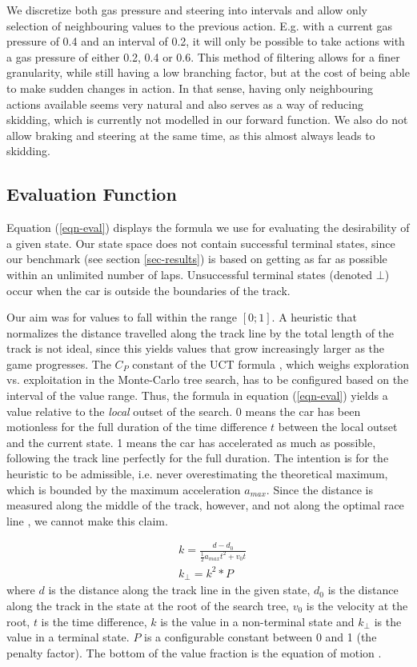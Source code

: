 \documentclass[conference]{IEEEtran}
\begin{document}
We discretize both gas pressure and steering into intervals and allow only selection of neighbouring values to the previous action. E.g. with a current gas pressure of 0.4 and an interval of 0.2, it will only be possible to take actions with a gas pressure of either 0.2, 0.4 or 0.6. This method of filtering allows for a finer granularity, while still having a low branching factor, but at the cost of being able to make sudden changes in action. In that sense, having only neighbouring actions available seems very natural and also serves as a way of reducing skidding, which is currently not modelled in our forward function. We also do not allow braking and steering at the same time, as this almost always leads to skidding.

\subsection{Evaluation Function}
Equation (\ref{eqn-eval}) displays the formula we use for evaluating the desirability of a given state. Our state space does not contain successful terminal states, since our benchmark (see section \ref{sec-results}) is based on getting as far as possible within an unlimited number of laps. Unsuccessful terminal states (denoted $\bot$) occur when the car is outside the boundaries of the track.

Our aim was for values to fall within the range $[0;1]$. A heuristic that normalizes the distance travelled along the track line by the total length of the track is not ideal, since this yields values that grow increasingly larger as the game progresses. The $C_P$ constant of the UCT formula \cite{browne}, which weighs exploration vs. exploitation in the Monte-Carlo tree search, has to be configured based on the interval of the value range. Thus, the formula in equation (\ref{eqn-eval}) yields a value relative to the \emph{local} outset of the search. 0 means the car has been motionless for the full duration of the time difference $t$ between the local outset and the current state. 1 means the car has accelerated as much as possible, following the track line perfectly for the full duration. The intention is for the heuristic to be admissible, i.e. never overestimating the theoretical maximum, which is bounded by the maximum acceleration $a_{max}$. Since the distance is measured along the middle of the track, however, and not along the optimal race line \cite{raceline}, we cannot make this claim.

\begin{equation}
\begin{alignedat}{1}
\label{eqn-eval}
& k = \frac{d - d_0}{\frac{1}{2}a_{max}t^2 + v_0t} \\
& k_\bot = k^2 * P
\end{alignedat}
\end{equation}
where $d$ is the distance along the track line in the given state, $d_0$ is the distance along the track in the state at the root of the search tree, $v_0$ is the velocity at the root, $t$ is the time difference, $k$ is the value in a non-terminal state and $k_\bot$ is the value in a terminal state. $P$ is a configurable constant between 0 and 1 (the penalty factor). The bottom of the value fraction is the equation of motion \cite{motion}.
\end{document}
